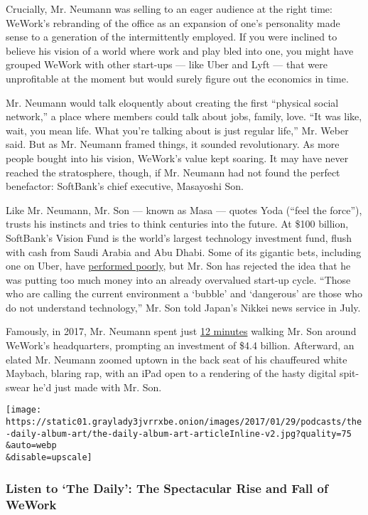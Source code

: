 Crucially, Mr. Neumann was selling to an eager audience at the right
time: WeWork's rebranding of the office as an expansion of one's
personality made sense to a generation of the intermittently employed.
If you were inclined to believe his vision of a world where work and
play bled into one, you might have grouped WeWork with other start-ups
--- like Uber and Lyft --- that were unprofitable at the moment but
would surely figure out the economics in time.

Mr. Neumann would talk eloquently about creating the first ``physical
social network,'' a place where members could talk about jobs, family,
love. ``It was like, wait, you mean life. What you're talking about is
just regular life,'' Mr. Weber said. But as Mr. Neumann framed things,
it sounded revolutionary. As more people bought into his vision,
WeWork's value kept soaring. It may have never reached the stratosphere,
though, if Mr. Neumann had not found the perfect benefactor: SoftBank's
chief executive, Masayoshi Son.

Like Mr. Neumann, Mr. Son --- known as Masa --- quotes Yoda (``feel the
force''), trusts his instincts and tries to think centuries into the
future. At \$100 billion, SoftBank's Vision Fund is the world's largest
technology investment fund, flush with cash from Saudi Arabia and Abu
Dhabi. Some of its gigantic bets, including one on Uber, have
\href{https://www.nytimes3xbfgragh.onion/2019/09/26/business/softbank-wework-masayoshi-son.html}{performed
poorly}, but Mr. Son has rejected the idea that he was putting too much
money into an already overvalued start-up cycle. ``Those who are calling
the current environment a `bubble' and `dangerous' are those who do not
understand technology,'' Mr. Son told Japan's Nikkei news service in
July.

Famously, in 2017, Mr. Neumann spent just
\href{http://nymag.com/intelligencer/2019/06/wework-adam-neumann.html}{12
minutes} walking Mr. Son around WeWork's headquarters, prompting an
investment of \$4.4 billion. Afterward, an elated Mr. Neumann zoomed
uptown in the back seat of his chauffeured white Maybach, blaring rap,
with an iPad open to a rendering of the hasty digital spit-swear he'd
just made with Mr. Son.

\texttt{[image: https://static01.graylady3jvrrxbe.onion/images/2017/01/29/podcasts/the-daily-album-art/the-daily-album-art-articleInline-v2.jpg?quality=75\\\&auto=webp\\\&disable=upscale]}

\hypertarget{listen-to-the-daily-the-spectacular-rise-and-fall-of-wework}{%
\subsubsection{Listen to `The Daily': The Spectacular Rise and Fall of
WeWork}\label{listen-to-the-daily-the-spectacular-rise-and-fall-of-wework}}

